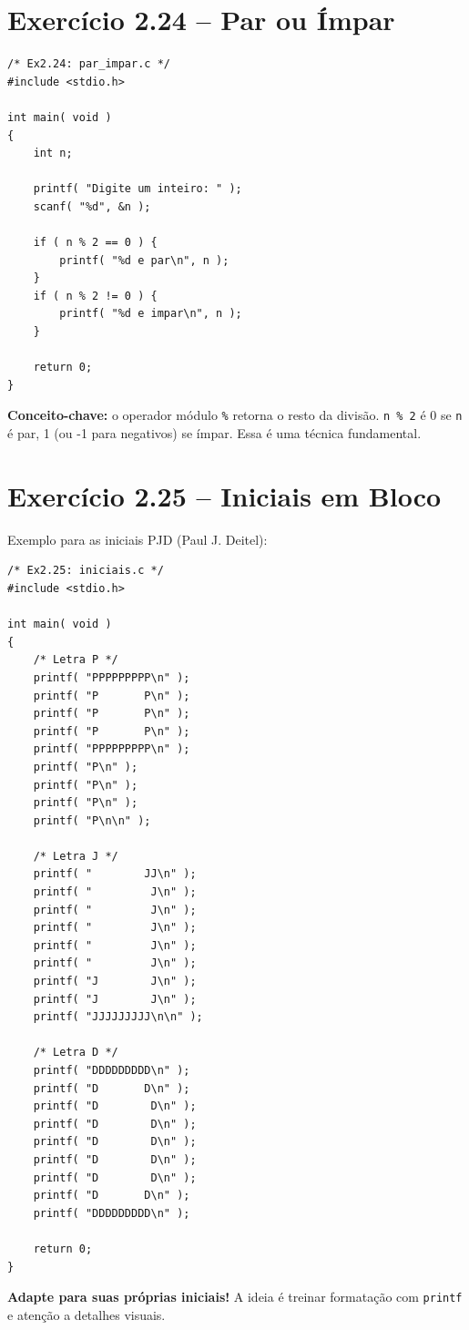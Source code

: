 \documentclass[12pt,a4paper]{article}
\begin{document}
\section{Exercício 2.24 -- Par ou Ímpar}

\begin{respostabox}
\begin{lstlisting}
/* Ex2.24: par_impar.c */
#include <stdio.h>

int main( void )
{
    int n;

    printf( "Digite um inteiro: " );
    scanf( "%d", &n );

    if ( n % 2 == 0 ) {
        printf( "%d e par\n", n );
    }
    if ( n % 2 != 0 ) {
        printf( "%d e impar\n", n );
    }

    return 0;
}
\end{lstlisting}

\textbf{Conceito-chave:} o operador módulo \texttt{\%} retorna o resto da divisão.
\texttt{n \% 2} é 0 se \texttt{n} é par, 1 (ou -1 para negativos) se ímpar. Essa
é uma técnica fundamental.
\end{respostabox}

\newpage

\section{Exercício 2.25 -- Iniciais em Bloco}

\begin{respostabox}
Exemplo para as iniciais PJD (Paul J. Deitel):

\begin{lstlisting}
/* Ex2.25: iniciais.c */
#include <stdio.h>

int main( void )
{
    /* Letra P */
    printf( "PPPPPPPPP\n" );
    printf( "P       P\n" );
    printf( "P       P\n" );
    printf( "P       P\n" );
    printf( "PPPPPPPPP\n" );
    printf( "P\n" );
    printf( "P\n" );
    printf( "P\n" );
    printf( "P\n\n" );

    /* Letra J */
    printf( "        JJ\n" );
    printf( "         J\n" );
    printf( "         J\n" );
    printf( "         J\n" );
    printf( "         J\n" );
    printf( "         J\n" );
    printf( "J        J\n" );
    printf( "J        J\n" );
    printf( "JJJJJJJJJ\n\n" );

    /* Letra D */
    printf( "DDDDDDDDD\n" );
    printf( "D       D\n" );
    printf( "D        D\n" );
    printf( "D        D\n" );
    printf( "D        D\n" );
    printf( "D        D\n" );
    printf( "D        D\n" );
    printf( "D       D\n" );
    printf( "DDDDDDDDD\n" );

    return 0;
}
\end{lstlisting}

\textbf{Adapte para suas próprias iniciais!} A ideia é treinar formatação com
\texttt{printf} e atenção a detalhes visuais.
\end{respostabox}
\end{document}
